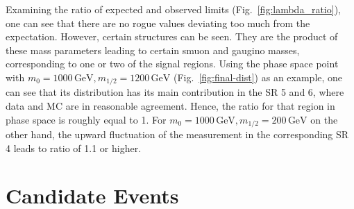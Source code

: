 Examining the ratio of expected and observed limits (Fig.~\ref{fig:lambda_ratio}), one can see that there are no rogue values deviating too much from the expectation. However, certain structures can be seen. They are the product of these mass parameters leading to certain smuon and gaugino masses, corresponding to one or two of the signal regions. Using the phase space point with $m_0 = 1000\,\text{GeV}, m_{1/2} = 1200\,\text{GeV}$ (Fig.~\ref{fig:final-dist}) as an example, one can see that its distribution has its main contribution in the SR 5 and 6, where data and MC are in reasonable agreement. Hence, the ratio for that region in phase space is roughly equal to 1. For $m_0 = 1000\,\text{GeV}, m_{1/2} = 200\,\text{GeV}$ on the other hand, the upward fluctuation of the measurement in the corresponding SR 4 leads to ratio of 1.1 or higher.


\section{Candidate Events}
\label{sec:candidate-events}


